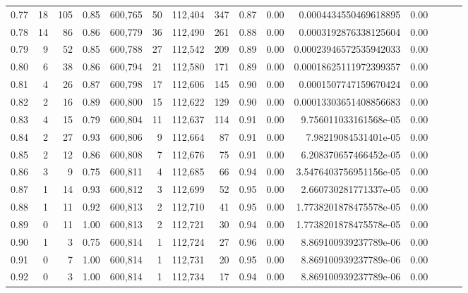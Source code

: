 \begin{tabular}{rrrrrrrrrrrrrrr}
0.77 &      18 &    105 &  0.85 &  600,765 &       50 &  112,404 &      347 &  0.87 &  0.00 &   0.0004434550469618895 &      0.00 \\
0.78 &      14 &     86 &  0.86 &  600,779 &       36 &  112,490 &      261 &  0.88 &  0.00 &   0.0003192876338125604 &      0.00 \\
0.79 &       9 &     52 &  0.85 &  600,788 &       27 &  112,542 &      209 &  0.89 &  0.00 &  0.00023946572535942033 &      0.00 \\
0.80 &       6 &     38 &  0.86 &  600,794 &       21 &  112,580 &      171 &  0.89 &  0.00 &  0.00018625111972399357 &      0.00 \\
0.81 &       4 &     26 &  0.87 &  600,798 &       17 &  112,606 &      145 &  0.90 &  0.00 &   0.0001507747159670424 &      0.00 \\
0.82 &       2 &     16 &  0.89 &  600,800 &       15 &  112,622 &      129 &  0.90 &  0.00 &  0.00013303651408856683 &      0.00 \\
0.83 &       4 &     15 &  0.79 &  600,804 &       11 &  112,637 &      114 &  0.91 &  0.00 &   9.756011033161568e-05 &      0.00 \\
0.84 &       2 &     27 &  0.93 &  600,806 &        9 &  112,664 &       87 &  0.91 &  0.00 &    7.98219084531401e-05 &      0.00 \\
0.85 &       2 &     12 &  0.86 &  600,808 &        7 &  112,676 &       75 &  0.91 &  0.00 &   6.208370657466452e-05 &      0.00 \\
0.86 &       3 &      9 &  0.75 &  600,811 &        4 &  112,685 &       66 &  0.94 &  0.00 &  3.5476403756951156e-05 &      0.00 \\
0.87 &       1 &     14 &  0.93 &  600,812 &        3 &  112,699 &       52 &  0.95 &  0.00 &   2.660730281771337e-05 &      0.00 \\
0.88 &       1 &     11 &  0.92 &  600,813 &        2 &  112,710 &       41 &  0.95 &  0.00 &  1.7738201878475578e-05 &      0.00 \\
0.89 &       0 &     11 &  1.00 &  600,813 &        2 &  112,721 &       30 &  0.94 &  0.00 &  1.7738201878475578e-05 &      0.00 \\
0.90 &       1 &      3 &  0.75 &  600,814 &        1 &  112,724 &       27 &  0.96 &  0.00 &   8.869100939237789e-06 &      0.00 \\
0.91 &       0 &      7 &  1.00 &  600,814 &        1 &  112,731 &       20 &  0.95 &  0.00 &   8.869100939237789e-06 &      0.00 \\
0.92 &       0 &      3 &  1.00 &  600,814 &        1 &  112,734 &       17 &  0.94 &  0.00 &   8.869100939237789e-06 &      0.00 \\

\end{tabular}
